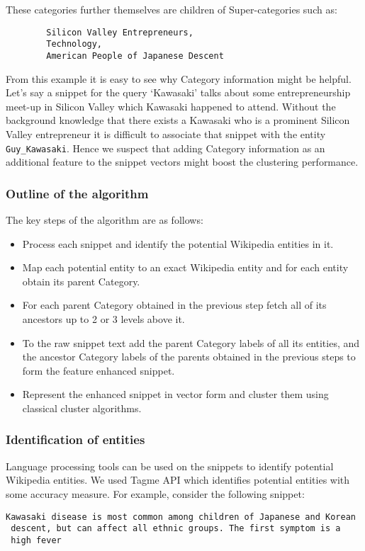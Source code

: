 \documentclass[a4paper,12pt]{report}
\begin{document}
These categories further themselves are children of Super-categories
such as:
\begin{verbatim}
        Silicon Valley Entrepreneurs,
        Technology,
        American People of Japanese Descent
\end{verbatim}


From this example it is easy to see why Category information might be
helpful. Let's say a snippet for the query `Kawasaki' talks about some
entrepreneurship meet-up in Silicon Valley which Kawasaki happened to
attend. Without the background knowledge that there exists a Kawasaki
who is a prominent Silicon Valley entrepreneur it is difficult to
associate that snippet with the entity \verb|Guy_Kawasaki|. Hence we
suspect that adding Category information as an additional feature to
the snippet vectors might boost the clustering performance.

\subsubsection{Outline of the algorithm}
The key steps of the algorithm are as follows:
\begin{itemize}
  \item Process each snippet and identify the potential Wikipedia
    entities in it.
  \item Map each potential entity to an exact Wikipedia entity and for
    each entity obtain its parent Category.
  \item For each parent Category obtained in the previous step fetch
    all of its ancestors up to 2 or 3 levels above it.
  \item To the raw snippet text add the parent Category labels of all its
    entities, and the ancestor Category labels of the parents obtained
    in the previous steps to form the feature enhanced snippet.
  \item Represent the enhanced snippet in vector form and cluster them
    using classical cluster algorithms.
\end{itemize}

\subsubsection{Identification of entities}

Language processing tools can be used on the snippets to identify
potential Wikipedia entities. We used Tagme API\cite{tagme} which
identifies potential entities with some accuracy measure. For example,
consider the following snippet:
\begin{verbatim}
Kawasaki disease is most common among children of Japanese and Korean
 descent, but can affect all ethnic groups. The first symptom is a
 high fever
\end{verbatim}
\end{document}
